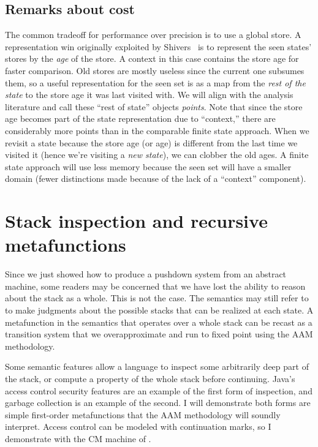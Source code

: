 \subsection{Remarks about cost}

The common tradeoff for performance over precision is to use a global store.
A representation win originally exploited by Shivers~\citep{ianjohnson:Shivers:1991:CFA} is to represent the seen states' stores by the \emph{age} of the store.
A context in this case contains the store age for faster comparison.
Old stores are mostly useless since the current one subsumes them, so a useful representation for the seen set is as a map from the \emph{rest of the state} to the store age it was last visited with.
We will align with the analysis literature and call these ``rest of state'' objects \emph{points}.
Note that since the store age becomes part of the state representation due to ``context,'' there are considerably more points than in the comparable finite state approach.
When we revisit a state because the store age (or  age) is different from the last time we visited it (hence we're visiting a \emph{new state}), we can clobber the old ages.
A finite state approach will use less memory because the seen set will have a smaller domain (fewer distinctions made because of the lack of a ``context'' component).


\section{Stack inspection and recursive metafunctions}\label{sec:inspection}

Since we just showed how to produce a pushdown system from an abstract machine, some readers may be concerned that we have lost the ability to reason about the stack as a whole.
This is not the case.
The semantics may still refer to  to make judgments about the possible stacks that can be realized at each state.
A metafunction in the semantics that operates over a whole stack can be recast as a transition system that we overapproximate and run to fixed point using the AAM methodology.

Some semantic features allow a language to inspect some arbitrarily deep part of the stack, or compute a property of the whole stack before continuing.
Java's access control security features are an example of the first form of inspection, and garbage collection is an example of the second.
I will demonstrate both forms are simple first-order metafunctions that the AAM methodology will soundly interpret.
Access control can be modeled with continuation marks, so I demonstrate with the CM machine of \citeauthor{dvanhorn:Clements2004Tailrecursive}.

